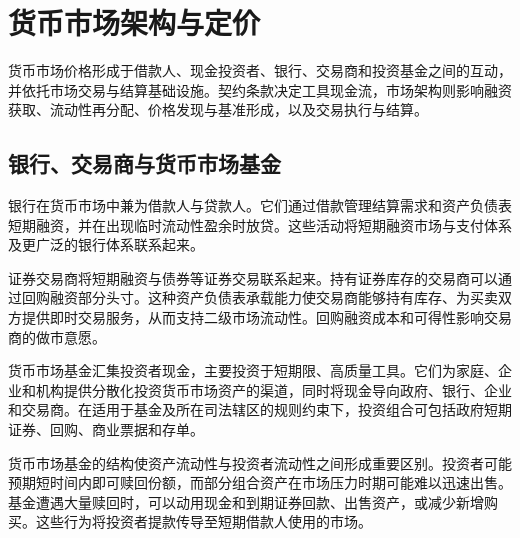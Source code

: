 \section{货币市场架构与定价}

货币市场价格形成于借款人、现金投资者、银行、交易商和投资基金之间的互动，并依托市场交易与结算基础设施。契约条款决定工具现金流，市场架构则影响融资获取、流动性再分配、价格发现与基准形成，以及交易执行与结算。

\subsection{银行、交易商与货币市场基金}

银行在货币市场中兼为借款人与贷款人。它们通过借款管理结算需求和资产负债表短期融资，并在出现临时流动性盈余时放贷。这些活动将短期融资市场与支付体系及更广泛的银行体系联系起来。

证券交易商将短期融资与债券等证券交易联系起来。持有证券库存的交易商可以通过回购融资部分头寸。这种资产负债表承载能力使交易商能够持有库存、为买卖双方提供即时交易服务，从而支持二级市场流动性。回购融资成本和可得性影响交易商的做市意愿。

货币市场基金汇集投资者现金，主要投资于短期限、高质量工具。它们为家庭、企业和机构提供分散化投资货币市场资产的渠道，同时将现金导向政府、银行、企业和交易商。在适用于基金及所在司法辖区的规则约束下，投资组合可包括政府短期证券、回购、商业票据和存单。

货币市场基金的结构使资产流动性与投资者流动性之间形成重要区别。投资者可能预期短时间内即可赎回份额，而部分组合资产在市场压力时期可能难以迅速出售。基金遭遇大量赎回时，可以动用现金和到期证券回款、出售资产，或减少新增购买。这些行为将投资者提款传导至短期借款人使用的市场。

